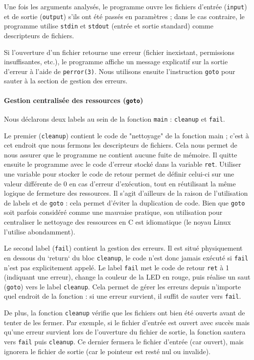 \documentclass[a4paper,11pt]{article}
\begin{document}
Une fois les arguments analysés, le programme ouvre les fichiers d'entrée (\texttt{input}) et de sortie (\texttt{output}) s'ils ont été passés en paramètres ; dans le cas contraire, le programme utilise \texttt{stdin} et \texttt{stdout} (entrée et sortie standard) comme descripteurs de fichiers.

Si l'ouverture d'un fichier retourne une erreur (fichier inexistant, permissions insuffisantes, etc.), le programme affiche un message explicatif sur la sortie d'erreur à l'aide de \texttt{perror(3)}. Nous utilisons ensuite l'instruction \texttt{goto} pour sauter à la section de gestion des erreurs.

\paragraph*{Gestion centralisée des ressources (\texttt{goto})}

Nous déclarons deux labels au sein de la fonction \texttt{main} : \texttt{cleanup} et \texttt{fail}.

Le premier (\texttt{cleanup}) contient le code de "nettoyage" de la fonction main ; c'est à cet endroit que nous fermons les descripteurs de fichiers. Cela nous permet de nous assurer que le programme ne contient aucune fuite de mémoire. Il quitte ensuite le programme avec le code d'erreur stocké dans la variable \texttt{ret}. Utiliser une variable pour stocker le code de retour permet de définir celui-ci sur une valeur différente de 0 en cas d'erreur d’exécution, tout en réutilisant la même logique de fermeture des ressources. Il s'agit d'ailleurs de la raison de l'utilisation de labels et de \texttt{goto} : cela permet d'éviter la duplication de code. Bien que \texttt{goto} soit parfois considéré comme une mauvaise pratique, son utilisation pour centraliser le nettoyage des ressources en C est idiomatique (le noyau Linux l'utilise abondamment).

Le second label (\texttt{fail}) contient la gestion des erreurs. Il est situé physiquement en dessous du `return` du bloc \texttt{cleanup}, le code n'est donc jamais exécuté si \texttt{fail} n'est pas explicitement appelé. Le label \texttt{fail} met le code de retour \texttt{ret} à 1 (indiquant une erreur), change la couleur de la LED en rouge, puis réalise un saut (\texttt{goto}) vers le label \texttt{cleanup}. Cela permet de gérer les erreurs depuis n'importe quel endroit de la fonction : si une erreur survient, il suffit de sauter vers \texttt{fail}.

De plus, la fonction \texttt{cleanup} vérifie que les fichiers ont bien été ouverts avant de tenter de les fermer. Par exemple, si le fichier d'entrée est ouvert avec succès mais qu'une erreur survient lors de l'ouverture du fichier de sortie, la fonction sautera vers \texttt{fail} puis \texttt{cleanup}. Ce dernier fermera le fichier d'entrée (car ouvert), mais ignorera le fichier de sortie (car le pointeur est resté nul ou invalide).
\end{document}
